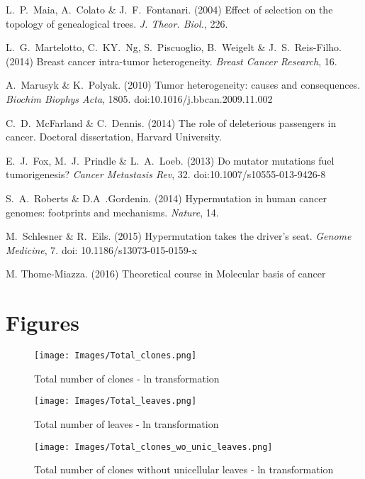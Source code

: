 \documentclass[a4paper]{article}
\begin{document}
\begin{multicols}{2}
\begin{thebibliography}{}
	L.~P.~Maia, A.~Colato \& J.~F.~Fontanari. (2004) Effect of selection on the topology of genealogical trees. {\em J. Theor. Biol.}, 226.	
	
	L.~G.~Martelotto, C.~KY.~Ng, S.~Piscuoglio, B.~Weigelt \& J.~S.~Reis-Filho. (2014) Breast cancer intra-tumor heterogeneity. {\em Breast Cancer Research}, 16.
	
	A.~Marusyk \& K.~Polyak. (2010) Tumor heterogeneity: causes and consequences. {\em Biochim Biophys Acta}, 1805. doi:10.1016/j.bbcan.2009.11.002
	
	C.~D.~McFarland \& C.~Dennis. (2014) The role of deleterious passengers in cancer. Doctoral dissertation, Harvard University.
	
	E.~J.~Fox, M.~J.~Prindle \& L.~A.~Loeb. (2013) Do mutator mutations fuel tumorigenesis? {\em Cancer Metastasis Rev}, 32. doi:10.1007/s10555-013-9426-8	
	
	 S.~A.~Roberts \& D.A~.Gordenin. (2014) Hypermutation in human cancer genomes: footprints and mechanisms. {\em Nature}, 14. 
	
	 M.~Schlesner \& R.~Eils. (2015) Hypermutation takes the driver's seat. {\em Genome Medicine}, 7. doi: 10.1186/s13073-015-0159-x 			
	
	M. Thome-Miazza. (2016) Theoretical course in Molecular basis of cancer







\end{thebibliography}	
\end{multicols}	
\section{Figures}
\newpage
{}


\fancyhfoffset[R]{-50pt}
\fancyhfoffset[L]{-50pt}


\begin{figure}
	\texttt{[image: Images/Total\_clones.png]}
	\caption{Total number of clones - ln transformation}
	\label{Total clones}
\end{figure}
\begin{figure}
	\texttt{[image: Images/Total\_leaves.png]}
	\caption{Total number of leaves - ln transformation}
	\label{Total leaves}
\end{figure}
\newpage
\begin{figure}
	\texttt{[image: Images/Total\_clones\_wo\_unic\_leaves.png]}
	\caption{Total number of clones without unicellular leaves - ln transformation}
	\label{Total clones wo unic leaves}
\end{figure}
\end{document}
